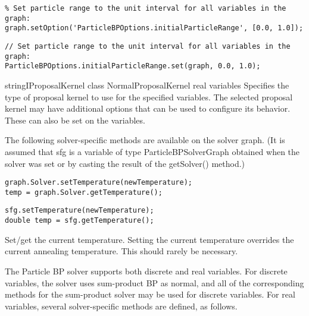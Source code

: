 \ifmatlab
\begin{lstlisting}
% Set particle range to the unit interval for all variables in the graph:
graph.setOption('ParticleBPOptions.initialParticleRange', [0.0, 1.0]);
\end{lstlisting}
\fi
\ifjava
\begin{lstlisting}
// Set particle range to the unit interval for all variables in the graph:
ParticleBPOptions.initialParticleRange.set(graph, 0.0, 1.0);
\end{lstlisting}
\fi


{\ifmatlab string\fi \ifjava IProposalKernel class\fi}
{NormalProposalKernel}
{real variables}
{Specifies the type of proposal kernel to use for the specified variables. The selected proposal kernel may have additional options that can be used to configure its behavior. These can also be set on the variables.}


The following solver-specific methods are available on the solver graph. \ifjava (It is assumed that sfg is a variable of type ParticleBPSolverGraph obtained when the solver was set or by casting the result of the getSolver() method.)\fi

\ifmatlab
\begin{lstlisting}
graph.Solver.setTemperature(newTemperature);
temp = graph.Solver.getTemperature();
\end{lstlisting}
\fi

\ifjava
\begin{lstlisting}
sfg.setTemperature(newTemperature);
double temp = sfg.getTemperature();
\end{lstlisting}
\fi

Set/get the current temperature. Setting the current temperature overrides the current annealing temperature. This should rarely be necessary.


The Particle BP solver supports both discrete and real variables. For discrete variables, the solver uses sum-product BP as normal, and all of the corresponding methods for the sum-product solver may be used for discrete variables. For real variables, several solver-specific methods are defined, as follows.

\label{sec:ParticleBPRealVariableSpecificMethods}

